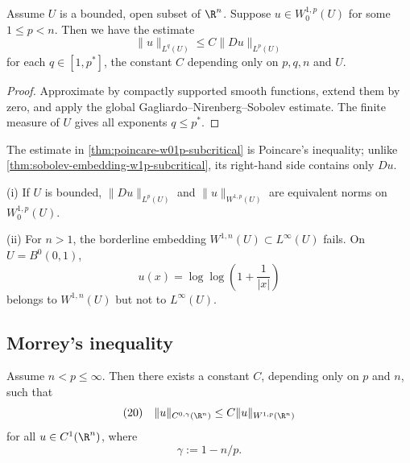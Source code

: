 \begin{theorem}
\label{thm:poincare-w01p-subcritical}
Assume $U$ is a bounded, open subset of $\R^n$. Suppose $u \in W_0^{1,p}(U)$ for some $1 \le p < n$. Then we have the estimate
$$\|u\|_{L^q(U)} \le C\|Du\|_{L^p(U)}$$
for each $q \in [1, p^*]$, the constant $C$ depending only on $p, q, n$ and $U$.
\end{theorem}

\begin{proof}
\sketch Approximate by compactly supported smooth functions, extend them by zero, and apply the global Gagliardo--Nirenberg--Sobolev estimate. The finite measure of $U$ gives all exponents $q\le p^*$.
\end{proof}

\begin{remark}
\label{rem:poincare-w01p-terminology}
The estimate in \cref{thm:poincare-w01p-subcritical} is Poincare's inequality; unlike \cref{thm:sobolev-embedding-w1p-subcritical}, its right-hand side contains only $Du$.
\end{remark}

\begin{remark}[Equivalent norm on $W_0^{1,p}$; the borderline case $p=n$]
\label{rem:borderline-case-p-equals-n}
(i) If $U$ is bounded, $\|Du\|_{L^p(U)}$ and $\|u\|_{W^{1,p}(U)}$ are equivalent norms on $W_0^{1,p}(U)$.

(ii) For $n>1$, the borderline embedding $W^{1,n}(U)\subset L^\infty(U)$ fails. On $U=B^0(0,1)$,
$$u(x)=\log\log\left(1+\frac{1}{|x|}\right)$$
belongs to $W^{1,n}(U)$ but not to $L^\infty(U)$.
\end{remark}

\subsection{Morrey's inequality}

\begin{theorem}
\label{thm:morreys-inequality}
Assume $n < p \le \infty$. Then there exists a constant $C$, depending only on $p$ and $n$, such that
$$(20) \quad \|u\|_{C^{0,\gamma}(\R^n)} \le C\|u\|_{W^{1,p}(\R^n)}$$
for all $u \in C^1(\R^n)$, where
$$\gamma := 1 - n/p.$$
\end{theorem}

